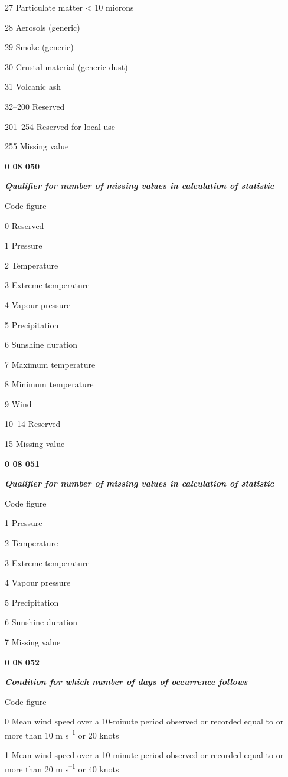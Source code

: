 27 Particulate matter \textless{} 10 microns

28 Aerosols (generic)

29 Smoke (generic)

30 Crustal material (generic dust)

31 Volcanic ash

32--200 Reserved

201--254 Reserved for local use

255 Missing value

\textbf{0 08 050}

\emph{\textbf{Qualifier for number of missing values in calculation of statistic}}

Code figure

0 Reserved

1 Pressure

2 Temperature

3 Extreme temperature

4 Vapour pressure

5 Precipitation

6 Sunshine duration

7 Maximum temperature

8 Minimum temperature

9 Wind

10--14 Reserved

15 Missing value

\textbf{0 08 051}

\emph{\textbf{Qualifier for number of missing values in calculation of statistic}}

Code figure

1 Pressure

2 Temperature

3 Extreme temperature

4 Vapour pressure

5 Precipitation

6 Sunshine duration

7 Missing value

\textbf{0 08 052}

\emph{\textbf{Condition for which number of days of occurrence follows}}

Code figure

0 Mean wind speed over a 10-minute period observed or recorded equal to or more than 10 m s\textsuperscript{--1} or 20 knots

1 Mean wind speed over a 10-minute period observed or recorded equal to or more than 20 m s\textsuperscript{--1} or 40 knots

